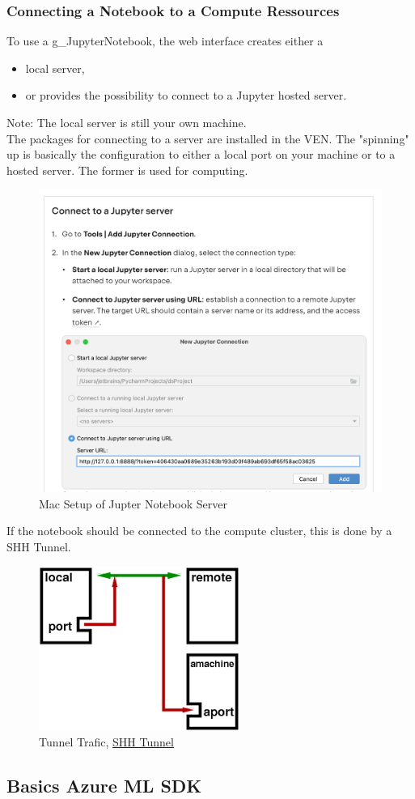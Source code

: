 \subsubsection{Connecting a Notebook to a Compute Ressources}
To use a \gls{g_JupyterNotebook}, the web interface creates either a
\begin{itemize}
	\item local server,
	\item or provides the possibility to connect to a Jupyter hosted server.
\end{itemize}
Note: The local server is still your own machine.\\

The packages for connecting to a server are installed in the \gls{VEN}. The "spinning" up is basically the configuration to either a local port on your machine or to a hosted server. The former is used for computing.

\begin{figure}[H]
	\centering
	\includegraphics[scale = 0.3]{attachment/chapter_AML/Scc008}
	\caption{Mac Setup of Jupter Notebook Server}
\end{figure}

If the notebook should be connected to the compute cluster, this is done by a SHH Tunnel.

\begin{figure}[H]
	\centering
	\includegraphics[scale = 0.3]{attachment/chapter_AML/Scc010}
	\caption{Tunnel Trafic, \href{https://radcamp.github.io/AF-Biota/Jupyter_Notebook_Setup.html}{SHH Tunnel}}
\end{figure}


\subsection{Basics Azure ML SDK}

